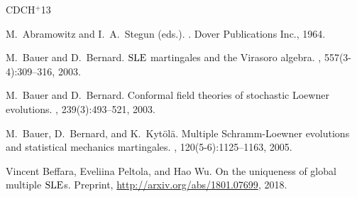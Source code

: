 \documentclass[oneside,english]{amsart}
\numberwithin{equation}{section}
\numberwithin{figure}{section}
\theoremstyle{plain}
\theoremstyle{plain}
\theoremstyle{plain}
\theoremstyle{remark}
\theoremstyle{plain}
\theoremstyle{plain}
\theoremstyle{plain}
\theoremstyle{plain}
\theoremstyle{plain}
\theoremstyle{plain}
\theoremstyle{plain}
\theoremstyle{plain}
\begin{document}
\newcommand{\etalchar}[1]{$^{#1}$}

\begin{thebibliography}{CDCH{\etalchar{+}}13}

M.~Abramowitz and I.~A.~Stegun (eds.).
.
\newblock Dover Publications Inc., 1964.





M.~Bauer and D.~Bernard.
\newblock $\mathrm{SLE}$ martingales and the Virasoro algebra.
, 557(3-4):309--316, 2003.

M.~Bauer and D.~Bernard.
\newblock Conformal field theories of stochastic Loewner evolutions.
, 239(3):493--521, 2003.


M.~Bauer, D.~Bernard, and K.~Kyt{\"o}l{\"a}.
\newblock Multiple {S}chramm-{L}oewner evolutions and statistical mechanics
  martingales.
, 120(5-6):1125--1163, 2005.

Vincent Beffara, Eveliina Peltola, and Hao Wu. 
\newblock On the uniqueness of global multiple $\mathrm{SLE}$s.
\newblock Preprint, \url{http://arxiv.org/abs/1801.07699}, 2018.


\end{thebibliography}
\end{document}
